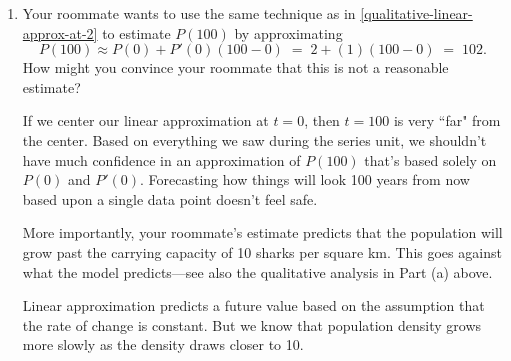 \documentclass[main]{subfiles}
\begin{document}
\begin{enumerate}
\begin{enumerate}[resume]
    
  \begin{solution}
    We know that $P(0)=2$. The differential equation tells us that $P' = \frac{5}{8}P(1-P/10)$, 
    which means that:
    $$
      P'(0) = \frac{5}{8} P(0) \left(1 - \frac{P(0)}{10} \right) \; = \; \frac{5}{8} (2) \left( 1 - \frac{2}{10} \right) \; = \; 1.
    $$
      Now we can use linear approximation (centered at $t=0$) to approximate:    
    $P(4) \approx P(0) + P'(0)(4-0) = 2 + (1)(4-0) = 6$     
    Therefore, we expect a population density of about 6 sharks per square km four years from now.
  \end{solution}

\pspace{\newpage}      
  \item
  \begin{problem}[1in]
    Your roommate wants to use the same technique as in \ref{qualitative-linear-approx-at-2} to estimate $P(100)$ by approximating
    \[P(100) \approx P(0) + P'(0)(100-0) \; = \; 2 + (1)(100 - 0) \; = \; 102.\]
    How might you convince your roommate that this is not a reasonable estimate?
  \end{problem}   
  
  \begin{solution}
    If we center our linear approximation at $t = 0$, then $t = 100$ is very ``far" from 
    the center.  Based on everything we saw during the series unit, we shouldn't have much
    confidence in an approximation of $P(100)$ that's based solely on $P(0)$ and $P'(0)$.
    Forecasting how things will look 100 years from now based upon a single data point 
    doesn't feel safe.
 
    More importantly, your roommate's estimate predicts that the population will grow past
    the carrying capacity of 10 sharks per square km.  This goes against what the model 
    predicts---see also the qualitative analysis in Part (a) above.
    
    Linear approximation predicts a future value based on the assumption that the rate of 
    change is constant.  But we know that population density grows more slowly as the density
    draws closer to 10.
  \end{solution}
  

\end{enumerate}
\end{enumerate}
\end{document}
